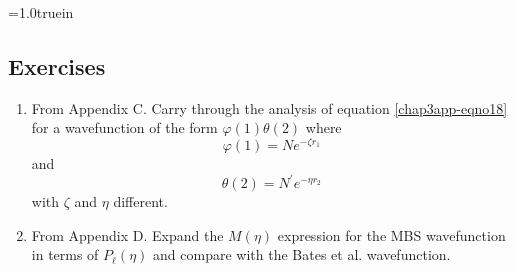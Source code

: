 \medskip

\parindent=1.0truein



\subsection{Exercises}

\begin{enumerate}
\item From Appendix C.  Carry through the analysis of equation
\ref{chap3app-eqno18} for a wavefunction of the form $\varphi(1)
\theta(2)$ where
\begin{equation}
\varphi(1) = Ne^{- \zeta r_1}
\end{equation}
and
\begin{equation}
\theta (2) = N^{\prime} e^{- \eta r_2}
\end{equation}
with $\zeta$ and $\eta$ different.

\item From Appendix D.  Expand the $M(\eta)$ expression for the MBS
wavefunction in terms of $P_\ell(\eta)$ and compare with the Bates et
al.  wavefunction.
\end{enumerate}
